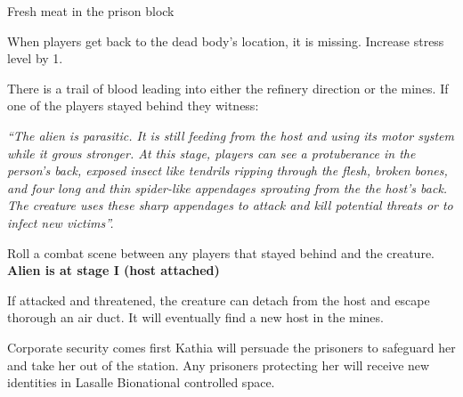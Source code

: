 \newsect



\begin{rpg-commentbox}{Fresh meat in the prison block}
    
    When players get back to the dead body's location, it is missing. Increase stress level by 1.
    
    There is a trail of blood leading into either the refinery direction or the mines. If one of the players stayed behind they witness:
    
    \textit{
    ``The alien is parasitic. It is still feeding from the host and using its motor system while it grows stronger. At this stage, players can see a protuberance in the person's back, exposed insect like tendrils ripping through the flesh, broken bones, and four long and thin spider-like appendages sprouting from the the host's back. The creature uses these sharp appendages to attack and kill potential threats or to infect new victims''.
    } 

    \medskip
    
    
    Roll a combat scene between any players that stayed behind and the creature. \textbf{Alien is at stage I (host attached)}
    
    If attacked and threatened, the creature can detach from the host and escape thorough an air duct. It will eventually find a new host in the mines.
    
    

\end{rpg-commentbox}    


\begin{rpg-commentbox}{Corporate security comes first}
    Kathia will persuade the prisoners to safeguard her and take her out of the station. Any prisoners protecting her will receive new identities in Lasalle Bionational controlled space.
\end{rpg-commentbox}
    


